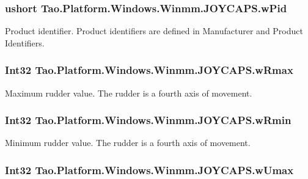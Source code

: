 \hypertarget{struct_tao_1_1_platform_1_1_windows_1_1_winmm_1_1_j_o_y_c_a_p_s_a8f7cd6ba40eb7523b4300c6996530485}{
\subsubsection[{wPid}]{\setlength{\rightskip}{0pt plus 5cm}ushort {\bf Tao.Platform.Windows.Winmm.JOYCAPS.wPid}}}
\label{struct_tao_1_1_platform_1_1_windows_1_1_winmm_1_1_j_o_y_c_a_p_s_a8f7cd6ba40eb7523b4300c6996530485}


Product identifier. Product identifiers are defined in Manufacturer and Product Identifiers. 

\hypertarget{struct_tao_1_1_platform_1_1_windows_1_1_winmm_1_1_j_o_y_c_a_p_s_ae35184e36b3152a51149aa79bab4e7d0}{
\subsubsection[{wRmax}]{\setlength{\rightskip}{0pt plus 5cm}Int32 {\bf Tao.Platform.Windows.Winmm.JOYCAPS.wRmax}}}
\label{struct_tao_1_1_platform_1_1_windows_1_1_winmm_1_1_j_o_y_c_a_p_s_ae35184e36b3152a51149aa79bab4e7d0}


Maximum rudder value. The rudder is a fourth axis of movement. 

\hypertarget{struct_tao_1_1_platform_1_1_windows_1_1_winmm_1_1_j_o_y_c_a_p_s_a6b35b89eb4a429bf27dd094cab0117cb}{
\subsubsection[{wRmin}]{\setlength{\rightskip}{0pt plus 5cm}Int32 {\bf Tao.Platform.Windows.Winmm.JOYCAPS.wRmin}}}
\label{struct_tao_1_1_platform_1_1_windows_1_1_winmm_1_1_j_o_y_c_a_p_s_a6b35b89eb4a429bf27dd094cab0117cb}


Minimum rudder value. The rudder is a fourth axis of movement. 

\hypertarget{struct_tao_1_1_platform_1_1_windows_1_1_winmm_1_1_j_o_y_c_a_p_s_a966ca99dc4d7ecaaa313a8196921b0b2}{
\subsubsection[{wUmax}]{\setlength{\rightskip}{0pt plus 5cm}Int32 {\bf Tao.Platform.Windows.Winmm.JOYCAPS.wUmax}}}
\label{struct_tao_1_1_platform_1_1_windows_1_1_winmm_1_1_j_o_y_c_a_p_s_a966ca99dc4d7ecaaa313a8196921b0b2}



